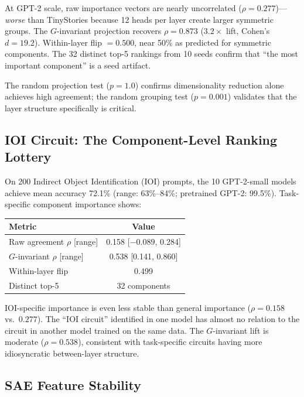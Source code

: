 \documentclass{jmlr}
\begin{document}
At GPT-2 scale, raw importance vectors are nearly uncorrelated ($\rho = 0.277$)---\emph{worse} than TinyStories because 12 heads per layer create larger symmetric groups. The $G$-invariant projection recovers $\rho = 0.873$ ($3.2\times$ lift, Cohen's $d = 19.2$). Within-layer flip $= 0.500$, near 50\% as predicted for symmetric components. The 32 distinct top-5 rankings from 10 seeds confirm that ``the most important component'' is a seed artifact.

The random projection test ($p = 1.0$) confirms dimensionality reduction alone achieves high agreement; the random grouping test ($p = 0.001$) validates that the layer structure specifically is critical.

\subsection{IOI Circuit: The Component-Level Ranking Lottery}
\label{sec:ioi}

On 200 Indirect Object Identification (IOI) prompts, the 10 GPT-2-small models achieve mean accuracy 72.1\% (range: 63\%--84\%; pretrained GPT-2: 99.5\%). Task-specific component importance shows:

\begin{center}
\small
\begin{tabular}{lc}
\toprule
\textbf{Metric} & \textbf{Value} \\
\midrule
Raw agreement $\rho$ [range] & 0.158 [$-0.089$, 0.284] \\
$G$-invariant $\rho$ [range] & 0.538 [0.141, 0.860] \\
Within-layer flip & 0.499 \\
Distinct top-5 & 32 components \\
\bottomrule
\end{tabular}
\end{center}

IOI-specific importance is even less stable than general importance ($\rho = 0.158$ vs.\ $0.277$). The ``IOI circuit'' identified in one model has almost no relation to the circuit in another model trained on the same data. The $G$-invariant lift is moderate ($\rho = 0.538$), consistent with task-specific circuits having more idiosyncratic between-layer structure.

\subsection{SAE Feature Stability}
\label{sec:sae}
\end{document}
